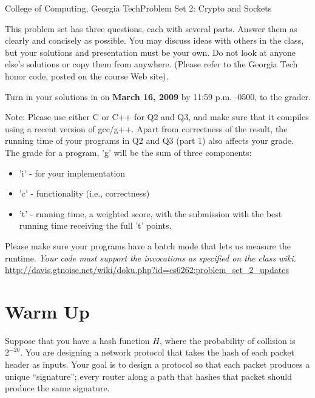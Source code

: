 \documentclass[11pt]{article}
\begin{document}


{College of Computing, Georgia Tech}{Problem Set 2: Crypto and Sockets}

This problem set has three questions, each with several parts.  Answer
them as clearly and concisely as possible.  You may discuss ideas with
others in the class, but your solutions and presentation must be your
own.  Do not look at anyone else's solutions or copy them from
anywhere. (Please refer to the Georgia Tech honor code, posted on the
course Web site).

Turn in your solutions in on {\bf March 16, 2009} by 11:59 p.m. -0500,
to the grader.

Note: Please use either C or C++ for Q2 and Q3, and make sure that it compiles
using a recent version of gcc/g++. Apart from correctness of the result,
the running time of your programs in Q2 and Q3 (part 1) also affects
your grade. The grade for a program, 'g' will be the sum of three
components:
\begin{itemize}
\item  'i' - for your implementation
\item  'c' - functionality (i.e., correctness)
\item  't' - running time, a weighted score, with the submission with the
        best running time receiving the full 't' points.
\end{itemize}
\noindent
Please make sure your programs have a batch mode that lets us measure
the runtime. {\em Your code must support the invocations as specified on
  the class wiki.} \\ \url{
  http://davis.gtnoise.net/wiki/doku.php?id=cs6262:problem_set_2_updates}

\section{Warm Up}

Suppose that you have a hash function $H$, where the probability of
collision is $2^{-20}$.  You are designing a network protocol that takes
the hash of each packet header as inputs.  Your goal is to design a
protocol so that each packet produces a unique ``signature''; every
router along a path that hashes that packet should produce the same
signature.
\end{document}
